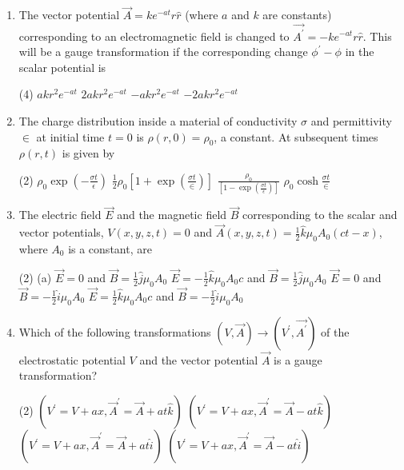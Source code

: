 \begin{enumerate}
	
	\item The vector potential $\vec{A}=k e^{-a t} r \hat{r}$ (where $a$ and $k$ are constants) corresponding to an electromagnetic field is changed to $\overrightarrow{A^{\prime}}=-k e^{-a t} r \hat{r}$. This will be a gauge transformation if the corresponding change $\phi^{\prime}-\phi$ in the scalar potential is
	{}
	\begin{tasks}(4)
		\task[\textbf{A.}] $a k r^{2} e^{-a t}$
		\task[\textbf{B.}] $2 a k r^{2} e^{-a t}$
		\task[\textbf{C.}] $-a k r^{2} e^{-a t}$
		\task[\textbf{D.}] $-2 a k r^{2} e^{-a t}$
	\end{tasks}
	\item The charge distribution inside a material of conductivity $\sigma$ and permittivity $\in$ at initial time $t=0$ is $\rho(r, 0)=\rho_{0}$, a constant. At subsequent times $\rho(r, t)$ is given by
	{}
	\begin{tasks}(2)
		\task[\textbf{A.}]  $\rho_{0} \exp \left(-\frac{\sigma t}{\epsilon}\right)$
		\task[\textbf{B.}] $\frac{1}{2} \rho_{0}\left[1+\exp \left(\frac{\sigma t}{\in}\right)\right]$
		\task[\textbf{C.}]  $\frac{\rho_{0}}{\left[1-\exp \left(\frac{\sigma t}{\epsilon}\right)\right]}$
		\task[\textbf{D.}] $\rho_{0} \cosh \frac{\sigma t}{\in}$
	\end{tasks}
	\item  The electric field $\vec{E}$ and the magnetic field $\vec{B}$ corresponding to the scalar and vector potentials, $V(x, y, z, t)=0$ and $\vec{A}(x, y, z, t)=\frac{1}{2} \hat{k} \mu_{0} A_{0}(c t-x)$, where $A_{0}$ is a constant, are 
	{}
	\begin{tasks}(2)
		\task[\textbf{A.}] (a) $\vec{E}=0$ and $\vec{B}=\frac{1}{2} \hat{j} \mu_{0} A_{0}$
		\task[\textbf{B.}] $\vec{E}=-\frac{1}{2} \hat{k} \mu_{0} A_{0} c$ and $\vec{B}=\frac{1}{2} \hat{j} \mu_{0} A_{0}$
		\task[\textbf{C.}]  $\vec{E}=0$ and $\vec{B}=-\frac{1}{2} \hat{i} \mu_{0} A_{0}$
		\task[\textbf{D.}] $\vec{E}=\frac{1}{2} \hat{k} \mu_{0} A_{0} c$ and $\vec{B}=-\frac{1}{2} \hat{i} \mu_{0} A_{0}$
	\end{tasks}
\item Which of the following transformations $(V, \vec{A}) \rightarrow\left(V^{\prime}, \overrightarrow{A^{\prime}}\right)$ of the electrostatic potential $V$ and the vector potential $\vec{A}$ is a gauge transformation?
{}
 \begin{tasks}(2)
	\task[\textbf{a.}]$\left(V^{\prime}=V+a x, \vec{A}^{\prime}=\vec{A}+a t \hat{k}\right)$
	\task[\textbf{b.}]$\left(V^{\prime}=V+a x, \vec{A}^{\prime}=\vec{A}-a t \hat{k}\right)$
	\task[\textbf{c.}]$\left(V^{\prime}=V+a x, \vec{A}^{\prime}=\vec{A}+a t \hat{i}\right)$
	\task[\textbf{d.}] $\left(V^{\prime}=V+a x, \vec{A}^{\prime}=\vec{A}-a t \hat{i}\right)$
\end{tasks}
\end{enumerate}



